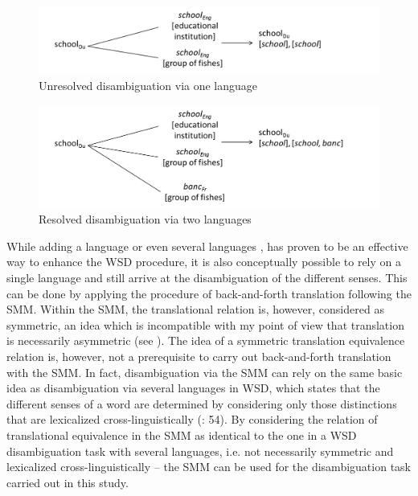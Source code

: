 \begin{figure}
\includegraphics[height=.3\textheight]{figures/Vandevoorde2-img5.png}
\caption{\label{fig:key:6}  Unresolved disambiguation via one language}
\end{figure}

\begin{figure}
\includegraphics[height=.3\textheight]{figures/Vandevoorde2-img6.png}
\caption{\label{fig:key:7}  Resolved disambiguation via two languages}
\end{figure}


While adding a language or even several languages \citep{gelbukh_five_2013}, has proven to be an effective way to enhance the WSD procedure, it is also conceptually possible to rely on a single language and still arrive at the disambiguation of the different senses. This can be done by applying the procedure of back-and-forth translation following the SMM. Within the SMM, the translational relation is, however, considered as symmetric, an idea which is incompatible with my point of view that translation is necessarily asymmetric (see ). The idea of a symmetric translation equivalence relation is, however, not a prerequisite to carry out back-and-forth translation with the SMM. In fact, disambiguation via the SMM can rely on the same basic idea as disambiguation via several languages in WSD, which states that the different senses of a word are determined by considering only those distinctions that are lexicalized cross-linguistically (\citealt{agirre_making_2007}: 54). By considering the relation of translational equivalence in the SMM as identical to the one in a WSD disambiguation task with several languages, i.e. not necessarily symmetric and lexicalized cross-linguistically – the SMM can be used for the disambiguation task carried out in this study.


